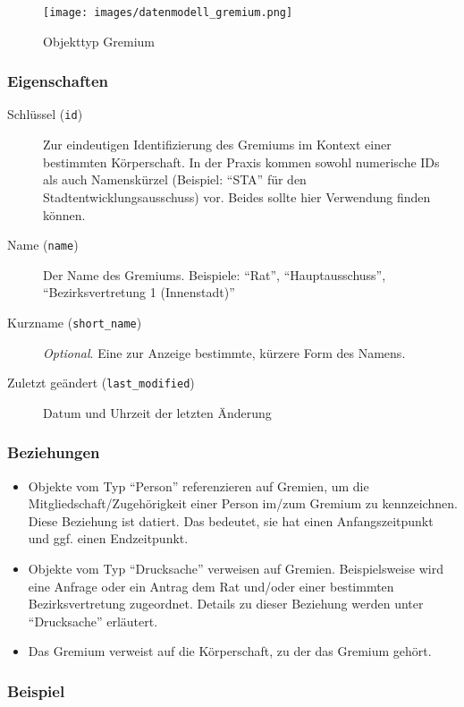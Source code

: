 \documentclass[,a4paper]{article}
\makeatletter
\def\maxwidth{\ifdim\Gin@nat@width>\linewidth\linewidth
\else\Gin@nat@width\fi}
\let\Oldincludegraphics\includegraphics
\renewcommand{\includegraphics}[1]{\Oldincludegraphics[width=\maxwidth]{#1}}
\makeatother
\begin{document}
\begin{figure}[htbp]
\centering
\texttt{[image: images/datenmodell\_gremium.png]}
\caption{Objekttyp Gremium}
\end{figure}

\subsubsection{Eigenschaften}

\begin{description}
\item[Schlüssel (\texttt{id})]
Zur eindeutigen Identifizierung des Gremiums im Kontext einer bestimmten
Körperschaft. In der Praxis kommen sowohl numerische IDs als auch
Namenskürzel (Beispiel: ``STA'' für den Stadtentwicklungsausschuss) vor.
Beides sollte hier Verwendung finden können.
\item[Name (\texttt{name})]
Der Name des Gremiums. Beispiele: ``Rat'', ``Hauptausschuss'',
``Bezirksvertretung 1 (Innenstadt)''
\item[Kurzname (\texttt{short\_name})]
\emph{Optional}. Eine zur Anzeige bestimmte, kürzere Form des Namens.
\item[Zuletzt geändert (\texttt{last\_modified})]
Datum und Uhrzeit der letzten Änderung
\end{description}

\subsubsection{Beziehungen}

\begin{itemize}
\item
  Objekte vom Typ ``Person'' referenzieren auf Gremien, um die
  Mitgliedschaft/Zugehörigkeit einer Person im/zum Gremium zu
  kennzeichnen. Diese Beziehung ist datiert. Das bedeutet, sie hat einen
  Anfangszeitpunkt und ggf. einen Endzeitpunkt.
\item
  Objekte vom Typ ``Drucksache'' verweisen auf Gremien. Beispielsweise
  wird eine Anfrage oder ein Antrag dem Rat und/oder einer bestimmten
  Bezirksvertretung zugeordnet. Details zu dieser Beziehung werden unter
  ``Drucksache'' erläutert.
\item
  Das Gremium verweist auf die Körperschaft, zu der das Gremium gehört.
\end{itemize}

\subsubsection{Beispiel}
\end{document}
